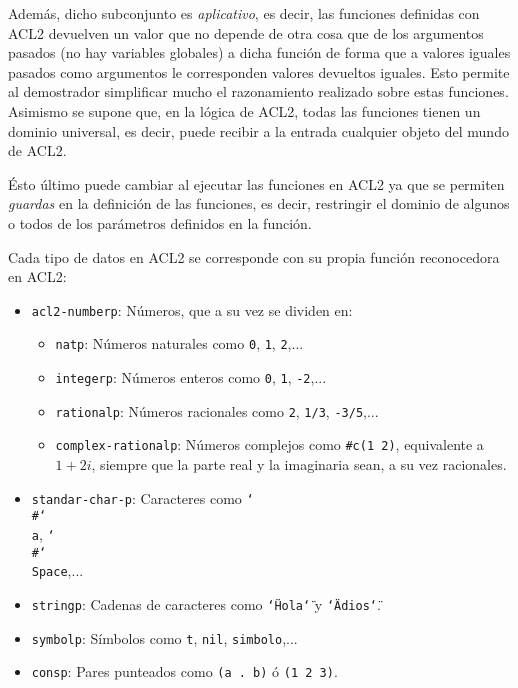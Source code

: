 \documentclass[a4paper,10pt]{article}
\begin{document}
\par\vspace{10pt}

Además, dicho subconjunto es \emph{aplicativo}, es decir, las funciones definidas con ACL2 devuelven un valor que no depende de otra cosa que de los argumentos pasados (no hay variables globales) a dicha función de forma que a valores iguales pasados como argumentos le corresponden valores devueltos iguales. Esto permite al demostrador simplificar mucho el razonamiento realizado sobre estas funciones. Asimismo se supone que, en la lógica de ACL2, todas las funciones tienen un dominio universal, es decir, puede recibir a la entrada cualquier objeto del mundo de ACL2.

\par\vspace{10pt}

Ésto último puede cambiar al ejecutar las funciones en ACL2 ya que se permiten \emph{guardas} en la definición de las funciones, es decir, restringir el dominio de algunos o todos de los parámetros definidos en la función.

\par\vspace{10pt}

Cada tipo de datos en ACL2 se corresponde con su propia función reconocedora en ACL2:

\par\vspace{10pt}

\begin{itemize}
	\item \texttt{acl2-numberp}: Números, que a su vez se dividen en:
	\begin{itemize}
		\item \texttt{natp}: Números naturales como \texttt{0}, \texttt{1}, \texttt{2},...
		\item \texttt{integerp}: Números enteros como \texttt{0}, \texttt{1}, \texttt{-2},...
		\item \texttt{rationalp}: Números racionales como \texttt{2}, \texttt{1/3}, \texttt{-3/5},...
		\item \texttt{complex-rationalp}: Números complejos como \texttt{\#c(1 2)}, equivalente a $1 + 2i$, siempre que la parte real y la imaginaria sean, a su vez racionales.
	\end{itemize}
	\item \texttt{standar-char-p}: Caracteres como \texttt{\char`\\\#\char`\\a}, \texttt{\char`\\\#\char`\\Space},...
	\item \texttt{stringp}: Cadenas de caracteres como \texttt{\char`\"Hola\char`\"} y \texttt{\char`\"Adios\char`\"}.
	\item \texttt{symbolp}: Símbolos como \texttt{t}, \texttt{nil}, \texttt{simbolo},...
	\item \texttt{consp}: Pares punteados como \texttt{(a . b)} ó \texttt{(1 2 3)}.
\end{itemize}
\end{document}
